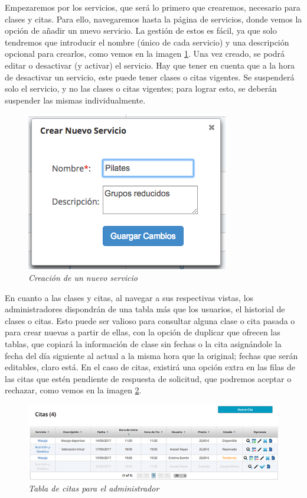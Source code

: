 Empezaremos por los servicios, que será lo primero que crearemos, necesario para clases y citas. Para ello, navegaremos hasta la página de servicios, donde vemos la opción de añadir un nuevo servicio. La gestión de estos es fácil, ya que solo tendremos que introducir el nombre (único de cada servicio) y una descripción opcional para crearlos, como vemos en la imagen \ref{fig:nuevo-servicio}. Una vez creado, se podrá editar o desactivar (y activar) el servicio. Hay que tener en cuenta que a la hora de desactivar un servicio, este puede tener clases o citas vigentes. Se suspenderá solo el servicio, y no las clases o citas vigentes; para lograr esto, se deberán suspender las mismas individualmente. 

\begin{figure}
\centering
  \includegraphics[scale=.70]{img/manual/crear-nuevo-servicio.jpg}
  \caption{\textit{Creación de un nuevo servicio}}
  \label{fig:nuevo-servicio}
\end{figure}

En cuanto a las clases y citas, al navegar a sus respectivas vistas, los administradores dispondrán de una tabla más que los usuarios, el historial de clases o citas. Esto puede ser valioso para consultar alguna clase o cita pasada o para crear nuevas a partir de ellas, con la opción de duplicar que ofrecen las tablas, que copiará la información de clase sin fechas o la cita asignándole la fecha del día siguiente al actual a la misma hora que la original; fechas que serán editables, claro está. En el caso de citas, existirá una opción extra en las filas de las citas que estén pendiente de respuesta de solicitud, que podremos aceptar o rechazar, como vemos en la imagen \ref{fig:tabla-citas-admin}. \\

\begin{figure}
\centering
  \includegraphics[scale=.70]{img/manual/tabla-citas-admin.jpg}
  \caption{\textit{Tabla de citas para el administrador}}
  \label{fig:tabla-citas-admin}
\end{figure}

